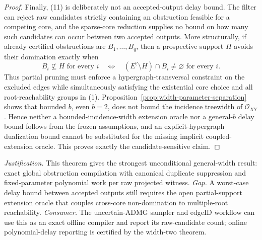 \documentclass{article}
\begin{document}
\begin{proof}
Finally, (11) is deliberately not an accepted-output delay bound.  The filter can reject raw candidates strictly containing an obstruction feasible for a competing core, and the sparse-core reduction supplies no bound on how many such candidates can occur between two accepted outputs.  More structurally, if already certified obstructions are \(B_1,\ldots,B_q\), then a prospective support \(H\) avoids their domination exactly when
\[
 B_i\nsubseteq H\text{ for every }i
 \quad\Longleftrightarrow\quad
 (E^{?}\setminus H)\cap B_i\ne\varnothing\text{ for every }i.
\tag{12}
\]
Thus partial pruning must enforce a hypergraph-transversal constraint on the excluded edges while simultaneously satisfying the existential core choice and all root-reachability groups in (1).  Proposition~\ref{prop:width-parameter-separation} shows that bounded \(b\), even \(b=2\), does not bound the incidence treewidth of \(\mathcal O_{XY}\).  Hence neither a bounded-incidence-width extension oracle nor a general-\(b\) delay bound follows from the frozen assumptions, and an explicit-hypergraph dualization bound cannot be substituted for the missing implicit coupled-extension oracle.  This proves exactly the candidate-sensitive claim.
\end{proof}
\par\smallskip\noindent \textit{Justification.} This theorem gives the strongest unconditional general-width result: exact global obstruction compilation with canonical duplicate suppression and fixed-parameter polynomial work per raw projected witness. \textit{Gap.} A worst-case delay bound between accepted outputs still requires the open partial-support extension oracle that couples cross-core non-domination to multiple-root reachability. \textit{Consumer.} The uncertain-ADMG sampler and edgeID workflow can use this as an exact offline compiler and report its raw-candidate count; online polynomial-delay reporting is certified by the width-two theorem.
\end{document}
